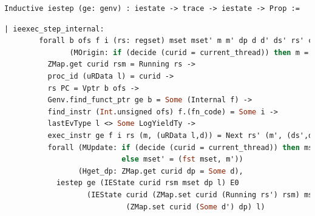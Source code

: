 \begin{lstlisting}[language=Caml]
  Inductive iestep (ge: genv) : iestate -> trace -> iestate -> Prop :=
\end{lstlisting}


\begin{lstlisting}[language=Caml]
    | ieexec_step_internal:
        forall b ofs f i (rs: regset) mset mset' m m' dp d d' ds' rs' curid rsm l
               (MOrigin: if (decide (curid = current_thread)) then m = fst mset else m = snd mset),
          ZMap.get curid rsm = Running rs ->
          proc_id (uRData l) = curid ->
          rs PC = Vptr b ofs ->
          Genv.find_funct_ptr ge b = Some (Internal f) ->
          find_instr (Int.unsigned ofs) f.(fn_code) = Some i ->
          lastEvType l <> Some LogYieldTy ->
          exec_instr ge f i rs (m, (uRData l,d)) = Next rs' (m', (ds',d')) ->
          forall (MUpdate: if (decide (curid = current_thread)) then mset' = (m', snd mset)
                           else mset' = (fst mset, m'))
                 (Hget_dp: ZMap.get curid dp = Some d),
            iestep ge (IEState curid rsm mset dp l) E0
                   (IEState curid (ZMap.set curid (Running rs') rsm) mset' 
                            (ZMap.set curid (Some d') dp) l)
\end{lstlisting}



